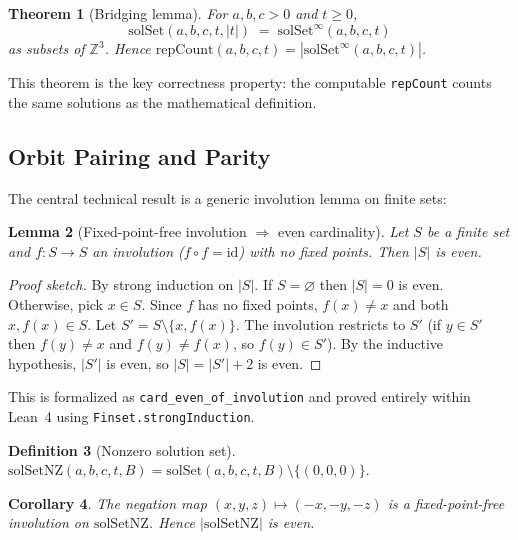 \documentclass[11pt,a4paper]{article}
\newtheorem{theorem}{Theorem}[section]
\newtheorem{lemma}[theorem]{Lemma}
\newtheorem{corollary}[theorem]{Corollary}
\theoremstyle{definition}
\newtheorem{definition}[theorem]{Definition}
\newcommand{\Z}{\mathbb{Z}}
\newcommand{\lean}[1]{\texttt{#1}}
\newcommand{\solSet}{\mathrm{solSet}}
\newcommand{\repCount}{\mathrm{repCount}}
\newcommand{\solSetInf}{\mathrm{solSet}^{\infty}}
\begin{document}
\begin{theorem}[Bridging lemma]\label{thm:bridge}
For $a, b, c > 0$ and $t \ge 0$,
\[
  \solSet(a,b,c,t,|t|) \;=\; \solSetInf(a,b,c,t)
\]
as subsets of $\Z^3$.  Hence $\repCount(a,b,c,t) =
|\solSetInf(a,b,c,t)|$.
\end{theorem}

This theorem is the key correctness property: the computable
\lean{repCount} counts the same solutions as the mathematical
definition.

\subsection{Orbit Pairing and Parity}\label{sec:s4}

The central technical result is a generic involution lemma on finite
sets:

\begin{lemma}[Fixed-point-free involution $\Rightarrow$ even cardinality]
\label{lem:involution}
Let $S$ be a finite set and $f\colon S \to S$ an involution
($f \circ f = \mathrm{id}$) with no fixed points.  Then
$|S|$ is even.
\end{lemma}

\begin{proof}[Proof sketch]
By strong induction on $|S|$.  If $S = \varnothing$ then
$|S| = 0$ is even.  Otherwise, pick $x \in S$.  Since $f$ has no
fixed points, $f(x) \ne x$ and both $x, f(x) \in S$.  Let
$S' = S \setminus \{x, f(x)\}$.  The involution restricts to $S'$
(if $y \in S'$ then $f(y) \ne x$ and $f(y) \ne f(x)$, so
$f(y) \in S'$).  By the inductive hypothesis, $|S'|$ is even, so
$|S| = |S'| + 2$ is even.
\end{proof}

This is formalized as \lean{card\_even\_of\_involution} and
proved entirely within Lean~4 using \lean{Finset.strongInduction}.

\begin{definition}[Nonzero solution set]
$\mathrm{solSetNZ}(a,b,c,t,B) = \solSet(a,b,c,t,B) \setminus \{(0,0,0)\}$.
\end{definition}

\begin{corollary}\label{cor:even-nonzero}
The negation map $(x,y,z) \mapsto (-x,-y,-z)$ is a
fixed-point-free involution on $\mathrm{solSetNZ}$.  Hence
$|\mathrm{solSetNZ}|$ is even.
\end{corollary}
\end{document}
